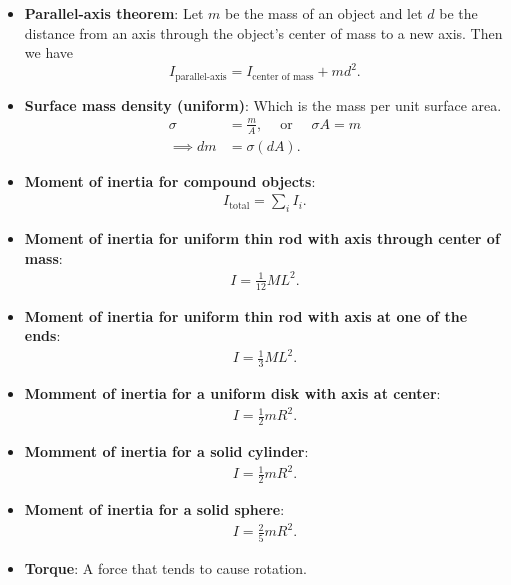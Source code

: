 \documentclass{report}
\begin{document}
\begin{itemize}
        \item \textbf{Parallel-axis theorem}:
            \bigbreak \noindent 
            Let $m$ be the mass of an object and let $d$ be the distance from an axis through the object's center of mass to a new axis. Then we have
            \[
                I_{\text{parallel-axis}} = I_{\text{center of mass}} + md^2.
            \]
        \item \textbf{Surface mass density (uniform)}: Which is the mass per unit surface area.
            \begin{align*}
                \sigma &= \frac{m}{A},\ \quad \text{or } \quad \sigma A = m\\
                \implies dm &=\sigma(dA)
            .\end{align*}
        \item \textbf{Moment of inertia for compound objects}:
            \begin{align*}
                I_{\text{total}} = \sum_i I_{i}
            .\end{align*}
        \item \textbf{Moment of inertia for uniform thin rod with axis through center of mass}:
            \begin{align*}
                I = \frac{1}{12}ML^{2}
            .\end{align*}
        \item \textbf{Moment of inertia for uniform thin rod with axis at one of the ends}:
            \begin{align*}
                I = \frac{1}{3}ML^{2}
            .\end{align*}
        \item \textbf{Momment of inertia for a uniform disk with axis at center}:
            \begin{align*}
                I = \frac{1}{2}mR^{2}
            .\end{align*}
        \item \textbf{Momment of inertia for a solid cylinder}:
            \begin{align*}
                I = \frac{1}{2}mR^{2}
            .\end{align*}
        \item \textbf{Moment of inertia for a solid sphere}:
            \begin{align*}
                I = \frac{2}{5}mR^{2}
            .\end{align*}
        \item \textbf{Torque}: A force that tends to cause rotation.

\end{itemize}
\end{document}
